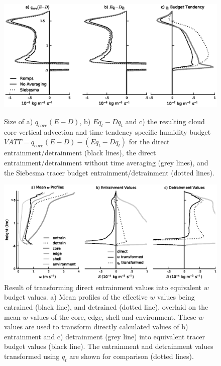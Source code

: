 \documentclass[12pt]{article}
\begin{document}
\begin{figure}[t]
  \noindent\includegraphics[width=39pc]{./figures/numerical_error}\\
  \caption{Size of a) $q_{core}(E-D)$, b) $Eq_t-Dq_t$ and c) the resulting 
  cloud core vertical advection and time tendency specific humidity budget 
  $VATT=q_{core}(E-D) - (Eq_t-Dq_t)$ for the direct entrainment/detrainment 
  (black lines), the direct entrainment/detrainment without time averaging 
  (grey lines), and the Siebesma tracer budget entrainment/detrainment 
  (dotted lines).}
  \label{fig:numerical_error}
\end{figure}

\begin{figure}[t]
  \noindent\includegraphics[width=39pc]{./figures/reynolds_correction_w}
  \caption{Result of transforming direct entrainment values into equivalent 
  $w$ budget values.  a) Mean profiles of the effective $w$ values being
  entrained (black line), and detrained (dotted line), overlaid on the mean 
  $w$ values of the core, edge, shell and environment.  These $w$ values are
  used to transform directly calculated values of b) entrainment and 
  c) detrainment (grey line) into equivalent tracer budget values (black 
  line).  The entrainment and detrainment values transformed using $q_t$ 
  are shown for comparison (dotted lines).}
  \label{fig:Reynolds_correction_w}
\end{figure}
\end{document}
